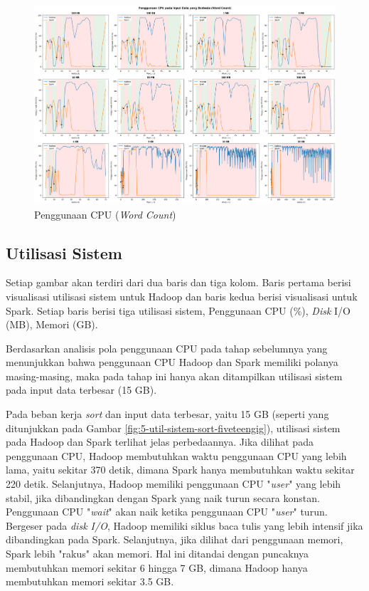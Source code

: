 \begin{landscape}
\begin{figure}[h]
    \centering
    \includegraphics[height=0.6\linewidth]{figures/ch04/4-penggunaan-cpu-all-wordcount.png}
    \caption{Penggunaan CPU (\textit{Word Count})}
    \label{fig:4-penggunaan-cpu-all-wordcount}
\end{figure}
\end{landscape}

\subsection{Utilisasi Sistem}
Setiap gambar akan terdiri dari dua baris dan tiga kolom. Baris pertama berisi visualisasi utilisasi sistem untuk Hadoop dan baris kedua berisi visualisasi untuk Spark. Setiap baris berisi tiga utilisasi sistem, Penggunaan CPU (\%), \textit{Disk} I/O (MB), Memori (GB).

Berdasarkan analisis pola penggunaan CPU pada tahap sebelumnya yang menunjukkan bahwa penggunaan CPU Hadoop dan Spark memiliki polanya masing-masing, maka pada tahap ini hanya akan ditampilkan utilisasi sistem pada input data terbesar (15 GB).

Pada beban kerja \textit{sort} dan input data terbesar, yaitu 15 GB (seperti yang ditunjukkan pada Gambar \ref{fig:5-util-sistem-sort-fiveteengig}), utilisasi sistem pada Hadoop dan Spark terlihat jelas perbedaannya. Jika dilihat pada penggunaan CPU, Hadoop membutuhkan waktu penggunaan CPU yang lebih lama, yaitu sekitar 370 detik, dimana Spark hanya membutuhkan waktu sekitar 220 detik. Selanjutnya, Hadoop memiliki penggunaan CPU "\textit{user}" yang lebih stabil, jika dibandingkan dengan Spark yang naik turun secara konstan. Penggunaan CPU "\textit{wait}" akan naik ketika penggunaan CPU "\textit{user}" turun. Bergeser pada \textit{disk I/O}, Hadoop memiliki siklus baca tulis yang lebih intensif jika dibandingkan pada Spark. Selanjutnya, jika dilihat dari penggunaan memori, Spark lebih "rakus" akan memori. Hal ini ditandai dengan puncaknya membutuhkan memori sekitar 6 hingga 7 GB, dimana Hadoop hanya membutuhkan memori sekitar 3.5 GB.

